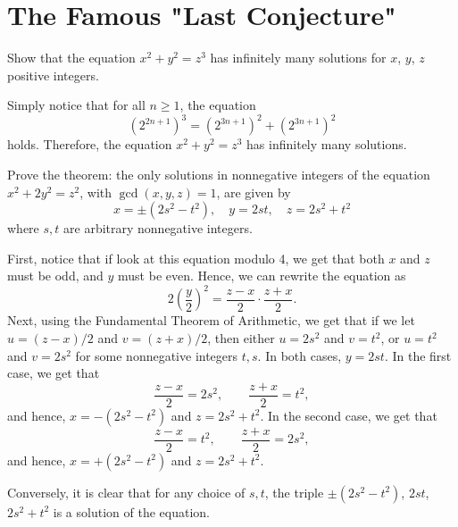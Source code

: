 \section{The Famous "Last Conjecture"}

\begin{exercise}
    Show that the equation $x^2 + y^2 = z^3$ has infinitely many solutions for $x$, $y$, $z$ positive integers.  \\
\end{exercise}

\begin{solution}
    Simply notice that for all $n \geq 1$, the equation
    $$\left(2^{2n+1}\right)^3 = \left(2^{3n+1}\right)^2 + \left(2^{3n+1}\right)^2$$
    holds. Therefore, the equation $x^2 + y^2 = z^3$ has infinitely many solutions.\\
\end{solution}

\begin{exercise}
    Prove the theorem: the only solutions in nonnegative integers of the equation $x^2 + 2y^2 = z^2$, with $\gcd(x,y, z) = 1$, are given by
    $$x = \pm (2s^2 - t^2), \quad y = 2st, \quad z = 2s^2 + t^2$$
    where $s,t$ are arbitrary nonnegative integers.  \\
\end{exercise}

\begin{solution}
    First, notice that if look at this equation modulo 4, we get that both $x$ and $z$ must be odd, and $y$ must be even. Hence, we can rewrite the equation as
    $$2\left(\frac{y}{2}\right)^2 = \frac{z-x}{2} \cdot \frac{z+x}{2}.$$
    Next, using the Fundamental Theorem of Arithmetic, we get that if we let $u = (z -x)/2$ and $v = (z + x)/2$, then either $u = 2s^2$ and $v = t^2$, or $u = t^2$ and $v = 2s^2$ for some nonnegative integers $t,s$. In both cases, $y = 2st$. In the first case, we get that
    $$\frac{z-x}{2} = 2s^2, \qquad \frac{z+x}{2} = t^2,$$
    and hence, $x = -(2s^2 - t^2)$ and $z = 2s^2 + t^2$. In the second case, we get that
    $$\frac{z-x}{2} = t^2, \qquad \frac{z+x}{2} = 2s^2,$$
    and hence, $x = +(2s^2 - t^2)$ and $z  = 2s^2 + t^2$.

    Conversely, it is clear that for any choice of $s,t$, the triple $\pm(2s^2-t^2)$, $2st$, $2s^2 + t^2$ is a solution of the equation. \\
\end{solution}

